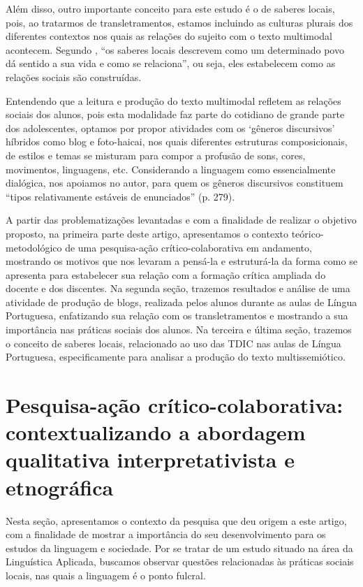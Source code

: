 \documentclass{textolivre}
\begin{document}
Além disso, outro importante conceito para este estudo é o de saberes locais, pois, ao tratarmos de transletramentos, estamos incluindo as culturas plurais dos diferentes contextos nos quais as relações do sujeito com o texto multimodal acontecem. Segundo \textcite[p.~44]{martins2010}, ``os saberes locais descrevem como um determinado povo dá sentido a sua vida e como se relaciona”, ou seja, eles estabelecem como as relações sociais são construídas. 

Entendendo que a leitura e produção do texto multimodal refletem as relações sociais dos alunos, pois esta modalidade faz parte do cotidiano de grande parte dos adolescentes, optamos por propor atividades com os `gêneros discursivos' \cite{bakhtin1997} híbridos como blog e foto-haicai, nos quais diferentes estruturas composicionais, de estilos e temas se misturam para compor a profusão de sons, cores, movimentos, linguagens, etc. Considerando a linguagem como essencialmente dialógica, nos apoiamos no autor, para quem os gêneros discursivos constituem “tipos relativamente estáveis de enunciados'' (p. 279). 

A partir das problematizações levantadas e com a finalidade de realizar o objetivo proposto, na primeira parte deste artigo, apresentamos o contexto teórico-metodológico de uma pesquisa-ação crítico-colaborativa em andamento, mostrando os motivos que nos levaram a pensá-la e estruturá-la da forma como se apresenta para estabelecer sua relação com a formação crítica ampliada do docente e dos discentes. Na segunda seção, trazemos resultados e análise de uma atividade de produção de blogs, realizada pelos alunos durante as aulas de Língua Portuguesa, enfatizando sua relação com os transletramentos e mostrando a sua importância nas práticas sociais dos alunos. Na terceira e última seção, trazemos o conceito de saberes locais, relacionado ao uso das TDIC nas aulas de Língua Portuguesa, especificamente para analisar a produção do texto multissemiótico.



\section{Pesquisa-ação crítico-colaborativa: contextualizando a abordagem qualitativa interpretativista e etnográfica}\label{sec-pesquisa}

Nesta seção, apresentamos o contexto da pesquisa que deu origem a este artigo, com a finalidade de mostrar a importância do seu desenvolvimento para os estudos da linguagem e sociedade. Por se tratar de um estudo situado na área da Linguística Aplicada, buscamos observar questões relacionadas às práticas sociais locais, nas quais a linguagem é o ponto fulcral.
\end{document}
